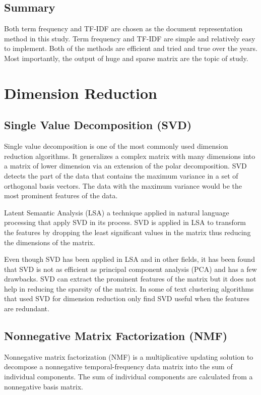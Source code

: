 \subsection{Summary}
Both term frequency and TF-IDF are chosen as the document representation method in this study. Term frequency and TF-IDF are simple and relatively easy to implement. Both of the methods are efficient and tried and true over the years. Most importantly, the output of huge and sparse matrix are the topic of study.\\

\clearpage
\section{Dimension Reduction}
\subsection{Single Value Decomposition (SVD)}
Single value decomposition is one of the most commonly used dimension reduction algorithms. It generalizes a complex matrix with many dimensions into a matrix of lower dimension via an extension of the polar decomposition. SVD detects the part of the data that contains the maximum variance in a set of orthogonal basis vectors. The data with the maximum variance would be the most prominent features of the data. \cite{svdDef}
	
Latent Semantic Analysis (LSA) a technique applied in natural language processing that apply SVD in its process. SVD is applied in LSA to transform the features by dropping the least significant values in the matrix thus reducing the dimensions of the matrix. \cite{fuzzyLash}
	
Even though SVD has been applied in LSA and in other fields, it has been found that SVD is not as efficient as principal component analysis (PCA) and has a few drawbacks. SVD can extract the prominent features of the matrix but it does not help in reducing the sparsity of the matrix. 	In some of text clustering algorithms that used SVD for dimension reduction only find SVD useful when the features are redundant. \cite{lingo}
		
\subsection{Nonnegative Matrix Factorization (NMF)}
Nonnegative matrix factorization (NMF) is a multiplicative updating solution to decompose a nonnegative temporal-frequency data matrix into the sum of individual components. The sum of individual components are calculated from a nonnegative basis matrix. \cite{nmfBook}
	
